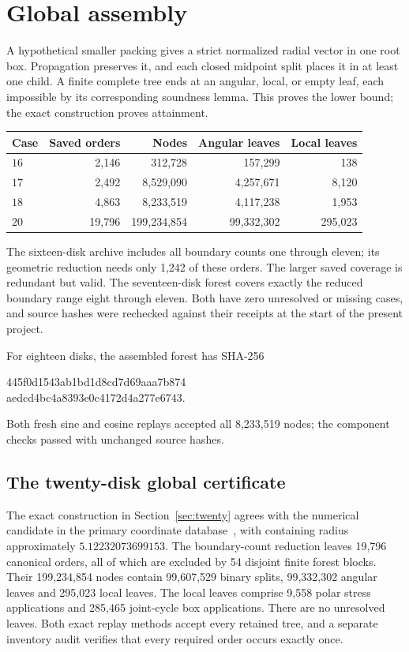 \documentclass[11pt]{amsart}
\theoremstyle{definition}
\theoremstyle{remark}
\begin{document}
\section{Global assembly}\label{sec:assembly}
A hypothetical smaller packing gives a strict normalized radial vector in
one root box. Propagation preserves it, and each closed midpoint split
places it in at least one child. A finite complete tree ends at an angular,
local, or empty leaf, each impossible by its corresponding soundness lemma.
This proves the lower bound; the exact construction proves attainment.

\begin{center}
\begin{tabular}{@{}lrrrr@{}}
\toprule
Case & Saved orders & Nodes & Angular leaves & Local leaves\\
\midrule
$16$ & 2,146 & 312,728 & 157,299 & 138\\
$17$ & 2,492 & 8,529,090 & 4,257,671 & 8,120\\
$18$ & 4,863 & 8,233,519 & 4,117,238 & 1,953\\
$20$ & 19,796 & 199,234,854 & 99,332,302 & 295,023\\
\bottomrule
\end{tabular}
\end{center}
The sixteen-disk archive includes all boundary counts one through eleven;
its geometric reduction needs only 1,242 of these orders. The larger saved
coverage is redundant but valid. The seventeen-disk forest covers exactly
the reduced boundary range eight through eleven. Both have zero unresolved
or missing cases, and source hashes were rechecked against their receipts
at the start of the present project.

For eighteen disks, the assembled forest has SHA-256
\begin{center}\small\ttfamily
445f0d1543ab1bd1d8cd7d69aaa7b874\\
aedcd4bc4a8393e0c4172d4a277e6743.
\end{center}
Both fresh sine and cosine replays accepted all 8,233,519 nodes; the
component checks passed with unchanged source hashes.

\subsection{The twenty-disk global certificate}
The exact construction in Section~\ref{sec:twenty} agrees with the numerical
candidate in the primary coordinate database~\cite{specht}, with containing
radius approximately $5.12232073699153$.
The boundary-count reduction leaves 19,796 canonical orders, all of which
are excluded by 54 disjoint finite forest blocks. Their 199,234,854 nodes
contain 99,607,529 binary splits, 99,332,302 angular leaves and 295,023 local
leaves. The local leaves comprise 9,558 polar stress applications and
285,465 joint-cycle box applications. There are no unresolved leaves.
Both exact replay methods accept every retained tree, and a separate
inventory audit verifies that every required order occurs exactly once.
\end{document}
